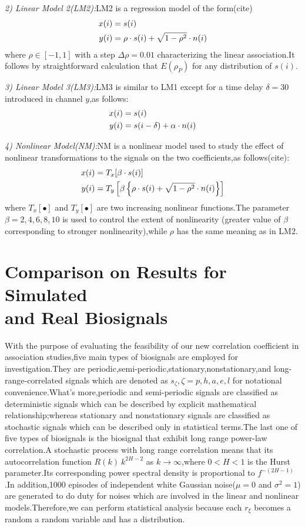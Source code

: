 \documentclass[journal]{IEEEtran}
\begin{document}
    \emph{2) Linear Model 2(LM2):}LM2 is a regression model of the form(cite)
      \begin{align}
        x(i)&=s(i) \notag \\
        y(i)&=\rho \cdot s(i)+\sqrt{1-\rho ^{2}}\cdot n(i)
      \end{align}
      where $ \rho \in [-1,1] $ with a step $ \Delta \rho =0.01 $ characterizing the linear association.It follows by straightforward calculation that $E(\rho_{P})$ for any distribution of $s(i)$.

     \emph{3) Linear Model 3(LM3):}LM3 is similar to LM1 except for a time delay $\delta =30$ introduced in channel $y$,as follows:
        \begin{align}
            x(i)&=s(i) \notag \\
            y(i)&=s(i-\delta)+\alpha \cdot n(i)
        \end{align}

    \emph{4) Nonlinear Model(NM):}NM is a nonlinear model used to study the effect of nonlinear transformations to the signals on the two coefficients,as follows(cite):
        \begin{align}
            x(i)&=T_{x}[\beta \cdot s(i)] \notag \\
            y(i)&=T_{y}\left [ \beta \left \{ \rho \cdot s(i)+\sqrt{1-\rho ^{2}}\cdot n(i) \right \} \right ]
        \end{align}
        where $T_{x}[\bullet]$ and $T_{y}[\bullet]$ are two increasing nonlinear functions.The parameter $\beta =2,4,6,8,10$ is used to control the extent of nonlinearity (greater value of $\beta$ corresponding to stronger nonlinearity),while $\rho$ has the same meaning as in LM2.


\section{Comparison on Results for Simulated\\and Real Biosignals}\label{sec:comparison}
    With the purpose of evaluating the feasibility of our new correlation coefficient in association studies,five main types of biosignals are employed for investigation.They are periodic,semi-periodic,stationary,nonstationary,and long-range-correlated signals which are denoted as $s_{\zeta },\zeta =p,h,a,e,l$ for notational convenience.What’s more,periodic and semi-periodic signals are classified as deterministic signals which can be described by explicit mathematical relationship;whereas stationary and nonstationary signals are classified as stochastic signals which can be described only in statistical terms.The last one of five types of biosignals is the biosignal that exhibit long range power-law correlation.A stochastic process with long range correlation means that its autocorrelation function $R(k)~k^{2H-2}$ as $k \rightarrow \infty$,where $0<H<1$ is the Hurst parameter.Its corresponding power spectral density is proportional to $f^{-(2H-1)}$.In addition,1000 episodes of independent white Gaussian noise($\mu=0$ and $\sigma^{2}=1$) are generated to do duty for noises which are involved in the linear and nonlinear models.Therefore,we can perform statistical analysis because each $r_{\xi}$ becomes a random a random variable and has a distribution.
\end{document}
